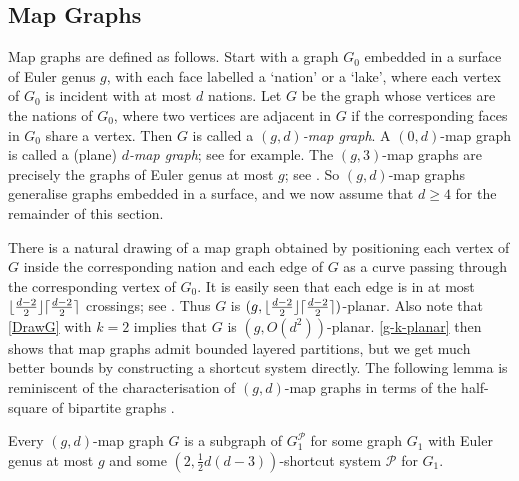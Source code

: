 \documentclass{patmorin}
\DeclarePairedDelimiter{\ceil}{\lceil}{\rceil}
\DeclarePairedDelimiter{\floor}{\lfloor}{\rfloor}
\newcommand{\PP}{\mathcal{P}}
\renewcommand{\geq}{\geqslant}
\begin{document}
\subsection{Map Graphs}

Map graphs are defined as follows. Start with a graph $G_0$ embedded in a surface of Euler genus $g$, with each face labelled a `nation' or a `lake', where each vertex of $G_0$ is incident with at most $d$ nations. Let $G$ be the graph whose vertices are the nations of $G_0$, where two vertices are adjacent in $G$ if the corresponding faces in $G_0$ share a vertex. Then $G$ is called a \emph{$(g,d)$-map graph}.  A $(0,d)$-map graph is called a (plane) \emph{$d$-map graph}; see \citep{FLS-SODA12,CGP02} for example. 
The $(g,3)$-map graphs are precisely the graphs of Euler genus at most $g$; see \citep{dujmovic.eppstein.ea:structure}. So $(g,d)$-map graphs generalise graphs embedded in a surface, and we now assume that $d\geq 4$ for the remainder of this section. 

There is a natural drawing of a map graph obtained by positioning each vertex of $G$ inside the corresponding nation and each edge of $G$ as a curve passing through the corresponding vertex of $G_0$. It is easily seen that each edge is in at most $\floor{\frac{d-2}{2}}\ceil{\frac{d-2}{2}}$ crossings; see \citep{dujmovic.eppstein.ea:structure}. Thus $G$ is $(g,\floor{\frac{d-2}{2}}\ceil{\frac{d-2}{2}})$-planar. Also note that \cref{DrawG} with $k=2$ implies that $G$ is $(g, O(d^{2}) )$-planar. \cref{g-k-planar} then shows that map graphs admit bounded layered partitions, but we get much better bounds by constructing a shortcut system directly.  The following lemma is reminiscent of the characterisation of $(g,d)$-map graphs in terms of the half-square of bipartite graphs \citep{CGP02,dujmovic.eppstein.ea:structure}. 


\begin{lem}
\label{MapShortcut}
Every $(g,d)$-map graph $G$ is a subgraph of $G_1^\PP$ for some graph $G_1$ with Euler genus at most $g$ and some $(2,\tfrac12 d(d-3) )$-shortcut system $\PP$ for $G_1$. 
\end{lem}
\end{document}

